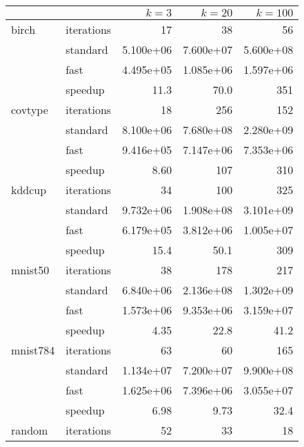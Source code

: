 \begin{table}
  \begin{tabular}{|llrrr|} \hline
             &            & \( k = 3 \) & \( k = 20 \) & \( k = 100 \) \\ \hline
    birch    & iterations &          17 &           38 &            56 \\
             & standard   &   5.100e+06 &    7.600e+07 &     5.600e+08 \\
             & fast       &   4.495e+05 &    1.085e+06 &     1.597e+06 \\
             & speedup    &        11.3 &         70.0 &           351 \\ \hline
    covtype  & iterations &          18 &          256 &           152 \\
             & standard   &   8.100e+06 &    7.680e+08 &     2.280e+09 \\
             & fast       &   9.416e+05 &    7.147e+06 &     7.353e+06 \\
             & speedup    &        8.60 &          107 &           310 \\ \hline
    kddcup   & iterations &          34 &          100 &           325 \\
             & standard   &   9.732e+06 &    1.908e+08 &     3.101e+09 \\
             & fast       &   6.179e+05 &    3.812e+06 &     1.005e+07 \\
             & speedup    &        15.4 &         50.1 &           309 \\ \hline
    mnist50  & iterations &          38 &          178 &           217 \\
             & standard   &   6.840e+06 &    2.136e+08 &     1.302e+09 \\
             & fast       &   1.573e+06 &    9.353e+06 &     3.159e+07 \\
             & speedup    &        4.35 &         22.8 &          41.2 \\ \hline
    mnist784 & iterations &          63 &           60 &           165 \\
             & standard   &   1.134e+07 &    7.200e+07 &     9.900e+08 \\
             & fast       &   1.625e+06 &    7.396e+06 &     3.055e+07 \\
             & speedup    &        6.98 &         9.73 &          32.4 \\ \hline
    random   & iterations &          52 &           33 &            18 \\

\end{tabular}
\end{table}
